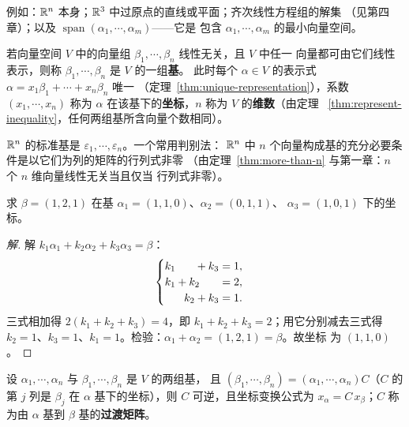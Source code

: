 例如：$\mathbb{R}^n$ 本身；$\mathbb{R}^3$ 中过原点的直线或平面；齐次线性方程组的解集
（见第四章）；以及 $\operatorname{span}(\alpha_1,\cdots,\alpha_m)$——它是
包含 $\alpha_1,\cdots,\alpha_m$ 的最小向量空间。

\begin{definition}\label{def:basis}
若向量空间 $V$ 中的向量组 $\beta_1,\cdots,\beta_n$ 线性无关，且 $V$ 中任一
向量都可由它们线性表示，则称 $\beta_1,\cdots,\beta_n$ 是 $V$ 的一组\textbf{基}。
此时每个 $\alpha\in V$ 的表示式 $\alpha=x_1\beta_1+\cdots+x_n\beta_n$ 唯一
（定理~\ref{thm:unique-representation}），系数 $(x_1,\cdots,x_n)$ 称为
$\alpha$ 在该基下的\textbf{坐标}，$n$ 称为 $V$ 的\textbf{维数}（由定理
~\ref{thm:represent-inequality}，任何两组基所含向量个数相同）。
\end{definition}

$\mathbb{R}^n$ 的标准基是 $\varepsilon_1,\cdots,\varepsilon_n$。一个常用判别法：
$\mathbb{R}^n$ 中 $n$ 个向量构成基的充分必要条件是以它们为列的矩阵的行列式非零
（由定理~\ref{thm:more-than-n} 与第一章：$n$ 个 $n$ 维向量线性无关当且仅当
行列式非零）。

\begin{example}
求 $\beta=(1,2,1)$ 在基 $\alpha_1=(1,1,0)$、$\alpha_2=(0,1,1)$、
$\alpha_3=(1,0,1)$ 下的坐标。
\end{example}
\begin{proof}[解]
解 $k_1\alpha_1+k_2\alpha_2+k_3\alpha_3=\beta$：
\[
  \begin{cases}
    k_1\hphantom{+k_2}+k_3=1, \\
    k_1+k_2\hphantom{+k_3}=2, \\
    \hphantom{k_1+}k_2+k_3=1.
  \end{cases}
\]
三式相加得 $2(k_1+k_2+k_3)=4$，即 $k_1+k_2+k_3=2$；用它分别减去三式得
$k_2=1$、$k_3=1$、$k_1=1$。检验：$\alpha_1+\alpha_2=(1,2,1)=\beta$。故坐标
为 $(1,1,0)$。
\end{proof}

设 $\alpha_1,\cdots,\alpha_n$ 与 $\beta_1,\cdots,\beta_n$ 是 $V$ 的两组基，
且 $(\beta_1,\cdots,\beta_n)=(\alpha_1,\cdots,\alpha_n)C$（$C$ 的第 $j$ 列是
$\beta_j$ 在 $\alpha$ 基下的坐标），则 $C$ 可逆，且坐标变换公式为
$x_\alpha=C\,x_\beta$；$C$ 称为由 $\alpha$ 基到 $\beta$ 基的\textbf{过渡矩阵}。


